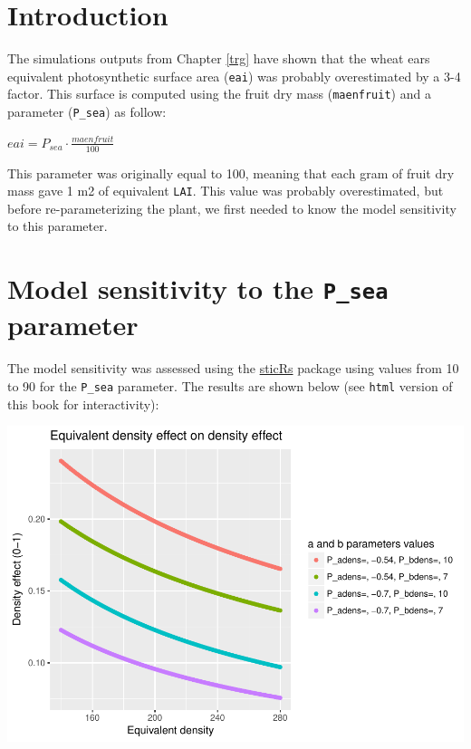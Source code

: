 \documentclass[]{book}
\theoremstyle{definition}
\theoremstyle{definition}
\theoremstyle{definition}
\theoremstyle{remark}
\begin{document}
\section{Introduction}\label{introduction-1}

The simulations outputs from Chapter \ref{trg} have shown that the wheat
ears equivalent photosynthetic surface area (\texttt{eai}) was probably
overestimated by a 3-4 factor. This surface is computed using the fruit
dry mass (\texttt{maenfruit}) and a parameter (\texttt{P\_sea}) as
follow:

\(eai=P_{sea}\cdot\frac{maenfruit}{100}\)

This parameter was originally equal to 100, meaning that each gram of
fruit dry mass gave 1 m2 of equivalent \texttt{LAI}. This value was
probably overestimated, but before re-parameterizing the plant, we first
needed to know the model sensitivity to this parameter.

\section{\texorpdfstring{Model sensitivity to the \texttt{P\_sea}
parameter}{Model sensitivity to the P\_sea parameter}}\label{model-sensitivity-to-the-p_sea-parameter}

The model sensitivity was assessed using the
\href{https://github.com/VEZY/sticRs}{sticRs} package using values from
10 to 90 for the \texttt{P\_sea} parameter. The results are shown below
(see \texttt{html} version of this book for interactivity):

\includegraphics{Postdoc_steps_files/figure-latex/unnamed-chunk-12-1.pdf}
\end{document}
